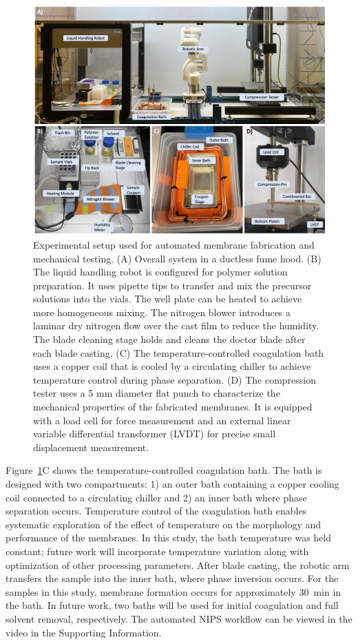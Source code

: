 \documentclass[preprint,12pt,times]{elsarticle}
\begin{document}
\begin{figure}[!ht]
\centering
\includegraphics[width=\linewidth]{Module_pics.jpg}
\caption{Experimental setup used for automated membrane fabrication and mechanical testing. (A) Overall system in a ductless fume hood. (B) The liquid handling robot is configured for polymer solution preparation. It uses pipette tips to transfer and mix the precursor solutions into the vials. The well plate can be heated to achieve more homogeneous mixing. The nitrogen blower introduces a laminar dry nitrogen flow over the cast film to reduce the humidity. The blade cleaning stage holds and cleans the doctor blade after each blade casting. (C) The temperature-controlled coagulation bath uses a copper coil that is cooled by a circulating chiller to achieve temperature control during phase separation. (D) The compression tester uses a 5 mm diameter flat punch to characterize the mechanical properties of the fabricated membranes. It is equipped with a load cell for force measurement and an external linear variable differential transformer (LVDT) for precise small displacement measurement.}
\label{Module_pics.jpg}
\end{figure}

Figure~\ref{Module_pics.jpg}C shows the temperature-controlled coagulation bath. The bath is designed with two compartments: 1) an outer bath containing a copper cooling coil connected to a circulating chiller and 2) an inner bath where phase separation occurs. Temperature control of the coagulation bath enables systematic exploration of the effect of temperature on the morphology and performance of the membranes. In this study, the bath temperature was held constant; future work will incorporate temperature variation along with optimization of other processing parameters. After blade casting, the robotic arm transfers the sample into the inner bath, where phase inversion occurs. For the samples in this study, membrane formation occurs for approximately 30~min in the bath. In future work, two baths will be used for initial coagulation and full solvent removal, respectively. The automated NIPS workflow can be viewed in the video in the Supporting Information.
\end{document}
